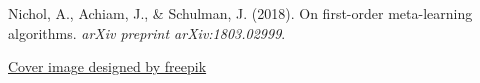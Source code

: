 \documentclass[12pt]{article}
\begin{document}
{{\begin{thebibliography}{9}
				Nichol, A., Achiam, J., \& Schulman, J. (2018). On first-order meta-learning algorithms. \textit{arXiv preprint arXiv:1803.02999}.
				
				\href{https://www.freepik.com/free-vector/cute-artificial-intelligence-robot-isometric-icon_16717130.htm}{Cover image designed by freepik}
				
			\end{thebibliography}
			
	}}
	
	
\end{document}
